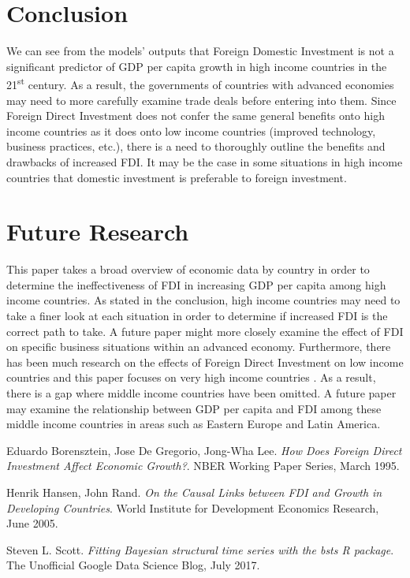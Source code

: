 \documentclass{article}
\begin{document}
\newpage
\section{Conclusion}
\quad We can see from the models' outputs that Foreign Domestic Investment is not a significant predictor of GDP per capita growth in high income countries in the 21\textsuperscript{st} century. As a result, the governments of countries with advanced economies may need to more carefully examine trade deals before entering into them. Since Foreign Direct Investment does not confer the same general benefits onto high income countries as it does onto low income countries (improved technology, business practices, etc.), there is a need to thoroughly outline the benefits and drawbacks of increased FDI. It may be the case in some situations in high income countries that domestic investment is preferable to foreign investment.
\section{Future Research}
\quad This paper takes a broad overview of economic data by country in order to determine the ineffectiveness of FDI in increasing GDP per capita among high income countries. As stated in the conclusion, high income countries may need to take a finer look at each situation in order to determine if increased FDI is the correct path to take. A future paper might more closely examine the effect of FDI on specific business situations within an advanced economy. Furthermore, there has been much research on the effects of Foreign Direct Investment on low income countries and this paper focuses on very high income countries \cite{borensztein, hansen}. As a result, there is a gap where middle income countries have been omitted. A future paper may examine the relationship between GDP per capita and FDI among these middle income countries in areas such as Eastern Europe and Latin America.
\newpage
\begin{thebibliography}{9}
Eduardo Borensztein, Jose De Gregorio, Jong-Wha Lee.
\textit{How Does Foreign Direct Investment Affect Economic Growth?}. NBER Working Paper Series, March 1995.

Henrik Hansen, John Rand.
\textit{On the Causal Links between FDI and Growth in Developing Countries}.
World Institute for Development Economics Research, June 2005.

Steven L. Scott. \textit{Fitting Bayesian structural time series with the bsts R package}. The Unofficial Google Data Science Blog, July 2017.
\end{thebibliography}
\end{document}
